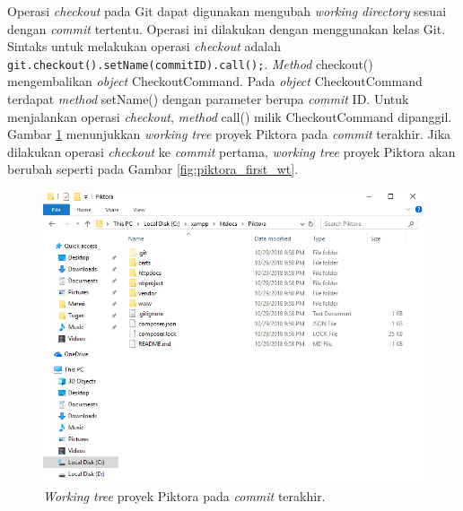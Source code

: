 Operasi \textit{checkout} pada Git dapat digunakan mengubah \textit{working directory} sesuai dengan \textit{commit} tertentu. Operasi ini dilakukan dengan menggunakan kelas Git. Sintaks untuk melakukan operasi \textit{checkout} adalah \texttt{git.checkout().setName(commitID).call();}. \textit{Method} checkout() mengembalikan \textit{object} CheckoutCommand. Pada \textit{object} CheckoutCommand terdapat \textit{method} setName() dengan parameter berupa \textit{commit} ID. Untuk menjalankan operasi \textit{checkout}, \textit{method} call() milik CheckoutCommand dipanggil. Gambar \ref{fig:piktora_last_wt} menunjukkan \textit{working tree} proyek Piktora pada \textit{commit} terakhir. Jika dilakukan operasi \textit{checkout} ke \textit{commit} pertama, \textit{working tree} proyek Piktora akan berubah seperti pada Gambar \ref{fig:piktora_first_wt}.

\begin{figure}[H]
	\centering
		\includegraphics[scale=0.6]{Gambar/piktora_last_commit.png}
	\caption{\textit{Working tree} proyek Piktora pada \textit{commit} terakhir.}
	\label{fig:piktora_last_wt}
\end{figure}


